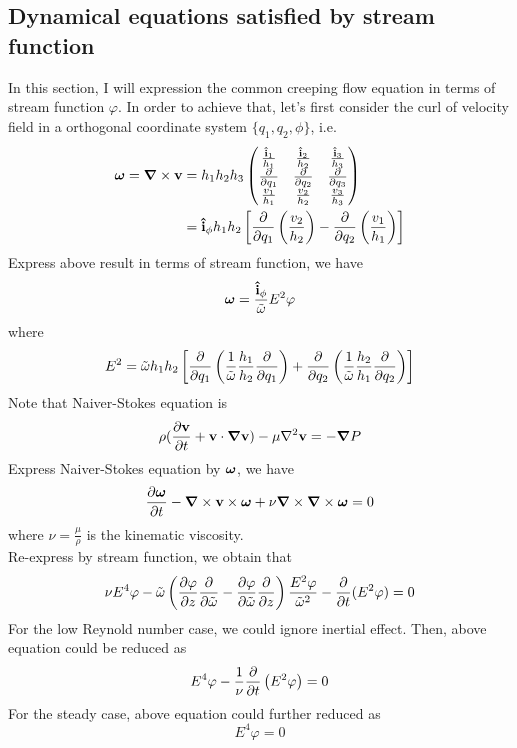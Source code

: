\documentclass[fontsize=11pt, %
                             paper=a4, %
                             twoside, %
                             captions=tableheading,
                             index=totoc,
                             hyperref]{labbook}
\begin{document}
\begin{addmargin}[4cm]{0cm}
\subsection{Dynamical equations satisfied by stream function}
In this section, I will expression the common creeping flow equation in terms of stream function $\varphi$. In order to achieve that, let's first consider the curl of velocity field in a orthogonal coordinate system $\{q_1,q_2,\phi\}$, i.e.
\begin{equation}
\begin{aligned}
\mbox{\boldmath$ \omega $}=\mbox{\boldmath$ \nabla $} \times \mathbf{v}&=h_1h_2h_3
\begin{pmatrix}
\frac{\mathbf{\hat{i}}_1}{h_1}&\frac{\mathbf{\hat{i}}_2}{h_2}&\frac{\mathbf{\hat{i}}_3}{h_3}\\
\frac{\partial }{\partial q_1}&\frac{\partial }{\partial q_2}&\frac{\partial }{\partial q_3}\\
\frac{v_1}{h_1}&\frac{v_2}{h_2}&\frac{v_3}{h_3}
\end{pmatrix}\\
&=\mathbf{\hat{i}}_\phi h_1h_2\left[\frac{\partial }{\partial q_1}\left(\frac{v_2}{h_2}\right)-\frac{\partial }{\partial q_2}\left(\frac{v_1}{h_1}\right)\right]
\end{aligned}
\end{equation}
Express above result in terms of stream function, we have
\begin{equation}
\mbox{\boldmath$ \omega $}=\frac{\mathbf{\hat{i}}_\phi}{\tilde\omega}E^2\varphi
\end{equation}
where
\begin{equation}\label{operatorE2}
E^2=\tilde{\omega}h_1h_2\left[\frac{\partial }{\partial q_1}\left(\frac{1}{\tilde{\omega}}\frac{h_1}{h_2}\frac{\partial }{\partial q_1}\right)+\frac{\partial }{\partial q_2}\left(\frac{1}{\tilde{\omega}}\frac{h_2}{h_1}\frac{\partial }{\partial q_2}\right)\right]
\end{equation}
Note that Naiver-Stokes equation is
\begin{equation}
\rho(\frac{\partial \mathbf{v}}{\partial t}+\mathbf{v}\cdot\mbox{\boldmath$ \nabla $} \mathbf{v})-\mu\nabla^2\mathbf{v}=-\mbox{\boldmath$ \nabla $} P
\end{equation}
Express Naiver-Stokes equation by $\mbox{\boldmath$ \omega $}$, we have
\begin{equation}
\frac{\partial \mbox{\boldmath$ \omega $}}{\partial t}-\mbox{\boldmath$ \nabla $} \times \mathbf{v}\times \mbox{\boldmath$ \omega $}+\nu\mbox{\boldmath$ \nabla $} \times \mbox{\boldmath$ \nabla $} \times \mbox{\boldmath$ \omega $}=0
\end{equation}
where $\nu=\frac{\mu}{\rho}$ is the kinematic viscosity.\\
Re-express by stream function, we obtain that
\begin{equation}
\nu E^4\varphi -\tilde{\omega}\left(\frac{\partial \varphi}{\partial z}\frac{\partial }{\partial \tilde{\omega}}-\frac{\partial \varphi}{\partial \tilde{\omega}}\frac{\partial }{\partial z}\right)\frac{E^2\varphi}{\tilde{\omega}^2}-\frac{\partial }{\partial t}(E^2\varphi)=0
\end{equation}
For the low Reynold number case, we could ignore inertial effect. Then, above equation could be reduced as
\begin{equation}
E^4\varphi-\frac{1}{\nu}\frac{\partial }{\partial t}\left(E^2\varphi\right)=0
\end{equation}
For the steady case, above equation could further reduced as
\begin{equation}
E^4\varphi=0
\end{equation}

\end{addmargin}
\end{document}
